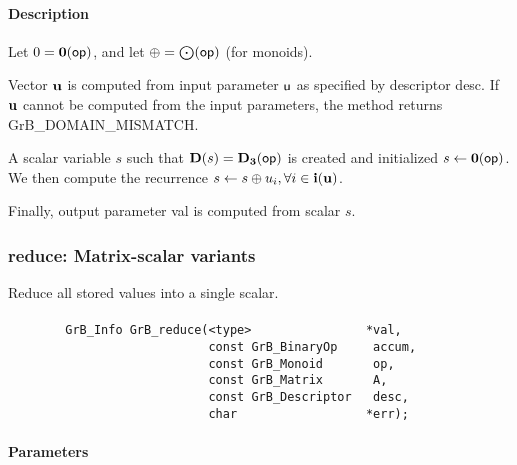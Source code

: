 \paragraph{Description}


Let $0 = \bold{0}({\sf op})$, and let $\oplus = \bigodot({\sf op})$ (for monoids).

Vector ${\bf u}$ is computed from input parameter ${\sf u}$ as
specified by descriptor {\sf desc}. If ${\bf u}$ cannot be computed
from the input parameters, the method returns {\sf GrB\_DOMAIN\_MISMATCH}.

A scalar variable $s$ such that $\bold{D}(s) = \bold{D_3}({\sf op})$ is
created and initialized $s \leftarrow \bold{0}({\sf op})$. 
We then compute the recurrence $s \leftarrow s \oplus u_i, \forall i \in {\bf i}({\bf u})$.

Finally, output parameter {\sf val} is computed from scalar $s$.

\subsubsection{{\sf reduce}: Matrix-scalar variants}
\label{Sec:Reduce_matrix_scalar}

Reduce all stored values into a single scalar.

\paragraph{\syntax}

\begin{verbatim}
        GrB_Info GrB_reduce(<type>                *val,
                            const GrB_BinaryOp     accum,
                            const GrB_Monoid       op,
                            const GrB_Matrix       A,
                            const GrB_Descriptor   desc,
                            char                  *err);
\end{verbatim}


\paragraph{Parameters}

